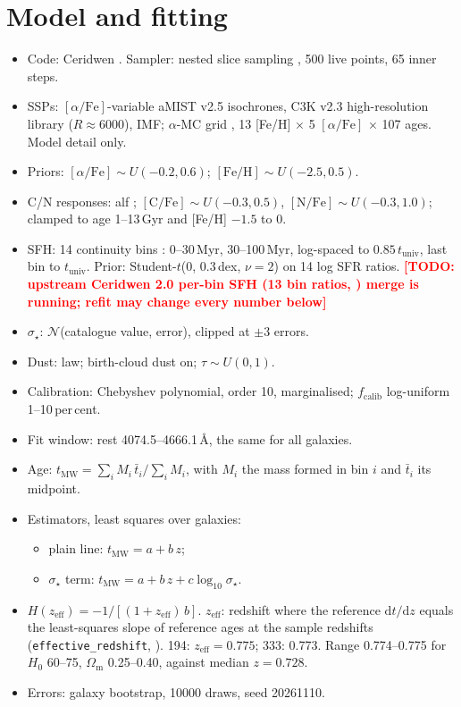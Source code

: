 \documentclass[fleqn,usenatbib]{mnras}
\newcommand{\todo}[1]{\textcolor{red}{\textbf{[TODO: #1]}}}
\newcommand{\sig}{\ensuremath{\sigma_\star}}
\newcommand{\zeff}{\ensuremath{z_\mathrm{eff}}}
\newcommand{\afe}{\ensuremath{[\alpha/\mathrm{Fe}]}}
\begin{document}
\section{Model and fitting}
\label{sec:model}
\begin{itemize}
\item Code: Ceridwen \citep{Stoffers2026}. Sampler: nested slice sampling \citep{Yallup2026}, 500 live points, 65 inner steps.
\item SSPs: \afe-variable aMIST v2.5 isochrones, C3K v2.3 high-resolution library ($R\approx6000$), \citet{Kroupa2001} IMF; $\alpha$-MC grid \citep{Park2025}, 13 [Fe/H] $\times$ 5 \afe{} $\times$ 107 ages. Model detail only.
\item Priors: $\afe\sim U(-0.2,0.6)$; $[\mathrm{Fe/H}]\sim U(-2.5,0.5)$.
\item C/N responses: alf \citep{ConroyvanDokkum2012,Conroy2018}; $[\mathrm{C/Fe}]\sim U(-0.3,0.5)$, $[\mathrm{N/Fe}]\sim U(-0.3,1.0)$; clamped to age 1--13\,Gyr and [Fe/H] $-1.5$ to 0.
\item SFH: 14 continuity bins \citep{Leja2019}: 0--30\,Myr, 30--100\,Myr, log-spaced to $0.85\,t_\mathrm{univ}$, last bin to $t_\mathrm{univ}$. Prior: Student-$t$(0, 0.3\,dex, $\nu=2$) on 14 log SFR ratios.
  \todo{upstream Ceridwen 2.0 per-bin SFH (13 bin ratios, \citealt[eq.~4]{Leja2019}) merge is running; refit may change every number below}
\item \sig: $\mathcal{N}$(catalogue value, error), clipped at $\pm3$ errors.
\item Dust: \citet{Noll2009} law; birth-cloud dust on; $\tau\sim U(0,1)$.
\item Calibration: Chebyshev polynomial, order 10, marginalised; $f_\mathrm{calib}$ log-uniform 1--10\,per\,cent.
\item Fit window: rest 4074.5--4666.1\,\AA, the same for all galaxies. 
\item Age: $t_\mathrm{MW} = \sum_i M_i\,\bar t_i / \sum_i M_i$, with $M_i$ the mass formed in bin $i$ and $\bar t_i$ its midpoint.
\item Estimators, least squares over galaxies:
  \begin{itemize}
  \item plain line: $t_\mathrm{MW} = a + b\,z$;
  \item \sig{} term: $t_\mathrm{MW} = a + b\,z + c\log_{10}\sig$.
  \end{itemize}
\item $H(\zeff) = -1/[(1+\zeff)\,b]$. $\zeff$: redshift where the reference $\mathrm{d}t/\mathrm{d}z$ equals the least-squares slope of reference ages at the sample redshifts (\texttt{effective\_redshift}, ). 194: $\zeff = 0.775$; 333: 0.773. Range 0.774--0.775 for $H_0$ 60--75, $\Omega_\mathrm{m}$ 0.25--0.40, against median $z=0.728$. 
\item Errors: galaxy bootstrap, 10000 draws, seed 20261110. 
\end{itemize}
\end{document}
